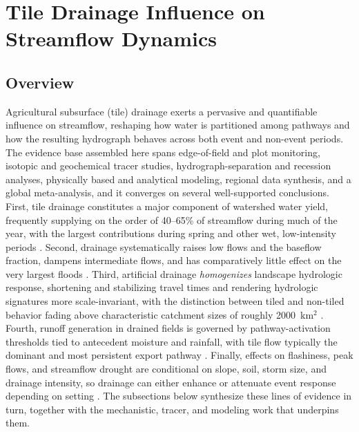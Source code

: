 \documentclass[11pt]{article}
\begin{document}
\section*{Tile Drainage Influence on Streamflow Dynamics}

\subsection{Overview}

Agricultural subsurface (tile) drainage exerts a pervasive and quantifiable influence on streamflow, reshaping how water is partitioned among pathways and how the resulting hydrograph behaves across both event and non-event periods. The evidence base assembled here spans edge-of-field and plot monitoring, isotopic and geochemical tracer studies, hydrograph-separation and recession analyses, physically based and analytical modeling, regional data synthesis, and a global meta-analysis, and it converges on several well-supported conclusions. First, tile drainage constitutes a major component of watershed water yield, frequently supplying on the order of 40--65\% of streamflow during much of the year, with the largest contributions during spring and other wet, low-intensity periods \parencite{King2014,Thomas2016,Schilling2019}. Second, drainage systematically raises low flows and the baseflow fraction, dampens intermediate flows, and has comparatively little effect on the very largest floods \parencite{Sloan2017,Schilling2008,Rathore2025}. Third, artificial drainage \emph{homogenizes} landscape hydrologic response, shortening and stabilizing travel times and rendering hydrologic signatures more scale-invariant, with the distinction between tiled and non-tiled behavior fading above characteristic catchment sizes of roughly 2000~km$^2$ \parencite{BolandBrien2014,DaneshYazdi2016,FoufoulaGeorgiou2015}. Fourth, runoff generation in drained fields is governed by pathway-activation thresholds tied to antecedent moisture and rainfall, with tile flow typically the dominant and most persistent export pathway \parencite{Williams2019,Williams2018,Macrae2019}. Finally, effects on flashiness, peak flows, and streamflow drought are conditional on slope, soil, storm size, and drainage intensity, so drainage can either enhance or attenuate event response depending on setting \parencite{Zhou2025,Rathore2025,Adelsperger2024}. The subsections below synthesize these lines of evidence in turn, together with the mechanistic, tracer, and modeling work that underpins them.
\end{document}
